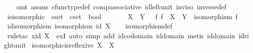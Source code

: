 \begin{isabellebody}
%
\isadelimproof
\ \ %
\endisadelimproof
%
\isatagproof
{}\isamarkupfalse%
\ {\isacharparenleft}{\kern0pt}smt\ assms\ cfunc{\isacharunderscore}{\kern0pt}type{\isacharunderscore}{\kern0pt}def\ comp{\isacharunderscore}{\kern0pt}associative\ id{\isacharunderscore}{\kern0pt}left{\isacharunderscore}{\kern0pt}unit\ inv{\isacharunderscore}{\kern0pt}iso\ inverse{\isacharunderscore}{\kern0pt}def{}{\isacharparenright}{\kern0pt}%
\endisatagproof
{\isafoldproof}%
%
\isadelimproof
\isanewline
%
\endisadelimproof
\isanewline
{}\isamarkupfalse%
\ is{\isacharunderscore}{\kern0pt}isomorphic\ {\isacharcolon}{\kern0pt}{\isacharcolon}{\kern0pt}\ {\isachardoublequoteopen}cset\ {\isasymRightarrow}\ cset\ {\isasymRightarrow}\ bool{\isachardoublequoteclose}\ {\isacharparenleft}{\kern0pt}\ {\isachardoublequoteopen}{\isasymcong}{\isachardoublequoteclose}\ {}{}{\isacharparenright}{\kern0pt}\ \ \isanewline
\ \ {\isachardoublequoteopen}X\ {\isasymcong}\ Y\ {\isasymlongleftrightarrow}\ {\isacharparenleft}{\kern0pt}{\isasymexists}\ f{\isachardot}{\kern0pt}\ f\ {\isacharcolon}{\kern0pt}\ X\ {\isasymrightarrow}\ Y\ {\isasymand}\ isomorphism\ f{\isacharparenright}{\kern0pt}{\isachardoublequoteclose}\isanewline
\isanewline
{}\isamarkupfalse%
\ id{\isacharunderscore}{\kern0pt}isomorphism{\isacharcolon}{\kern0pt}\ {\isachardoublequoteopen}isomorphism\ {\isacharparenleft}{\kern0pt}id\ X{\isacharparenright}{\kern0pt}{\isachardoublequoteclose}\isanewline
%
\isadelimproof
\ \ %
\endisadelimproof
%
\isatagproof
{}\isamarkupfalse%
\ isomorphism{\isacharunderscore}{\kern0pt}def\isanewline
\ \ \isamarkupfalse%
\ {\isacharparenleft}{\kern0pt}rule{\isacharunderscore}{\kern0pt}tac\ x{\isacharequal}{\kern0pt}{\isachardoublequoteopen}id\ X{\isachardoublequoteclose}\ \ exI{\isacharcomma}{\kern0pt}\ auto\ simp\ add{\isacharcolon}{\kern0pt}\ id{\isacharunderscore}{\kern0pt}codomain\ id{\isacharunderscore}{\kern0pt}domain{\isacharcomma}{\kern0pt}\ metis\ id{\isacharunderscore}{\kern0pt}domain\ id{\isacharunderscore}{\kern0pt}right{\isacharunderscore}{\kern0pt}unit{\isacharparenright}{\kern0pt}%
\endisatagproof
{\isafoldproof}%
%
\isadelimproof
\isanewline
%
\endisadelimproof
\isanewline
{}\isamarkupfalse%
\ isomorphic{\isacharunderscore}{\kern0pt}is{\isacharunderscore}{\kern0pt}reflexive{\isacharcolon}{\kern0pt}\ {\isachardoublequoteopen}X\ {\isasymcong}\ X{\isachardoublequoteclose}\isanewline
%
\isadelimproof
\ \ %
\endisadelimproof

\end{isabellebody}
